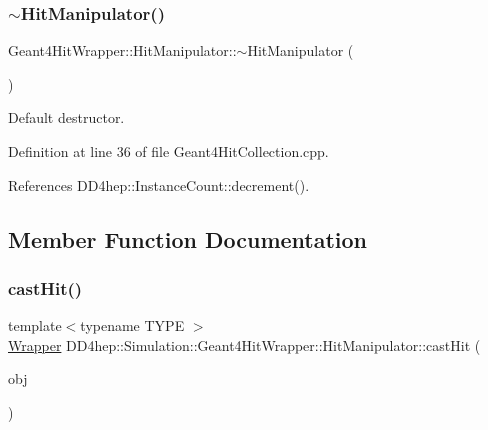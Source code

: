 \subsubsection{\texorpdfstring{$\sim$\+Hit\+Manipulator()}{~HitManipulator()}}
{\footnotesize\ttfamily Geant4\+Hit\+Wrapper\+::\+Hit\+Manipulator\+::$\sim$\+Hit\+Manipulator (\begin{DoxyParamCaption}{ }\end{DoxyParamCaption})}



Default destructor. 



Definition at line 36 of file Geant4\+Hit\+Collection.\+cpp.



References D\+D4hep\+::\+Instance\+Count\+::decrement().



\subsection{Member Function Documentation}
\hypertarget{class_d_d4hep_1_1_simulation_1_1_geant4_hit_wrapper_1_1_hit_manipulator_a593e21925633b7b165bd78287de5e294}{}\label{class_d_d4hep_1_1_simulation_1_1_geant4_hit_wrapper_1_1_hit_manipulator_a593e21925633b7b165bd78287de5e294} 
\subsubsection{\texorpdfstring{cast\+Hit()}{castHit()}}
{\footnotesize\ttfamily template$<$typename T\+Y\+PE $>$ \\
\hyperlink{class_d_d4hep_1_1_simulation_1_1_geant4_hit_wrapper_1_1_hit_manipulator_a4bb62cc7e4979a8d0aea281477a4e38e}{Wrapper} D\+D4hep\+::\+Simulation\+::\+Geant4\+Hit\+Wrapper\+::\+Hit\+Manipulator\+::cast\+Hit (\begin{DoxyParamCaption}\item[{T\+Y\+PE $\ast$}]{obj }\end{DoxyParamCaption})\hspace{0.3cm}{\ttfamily [inline]}}



